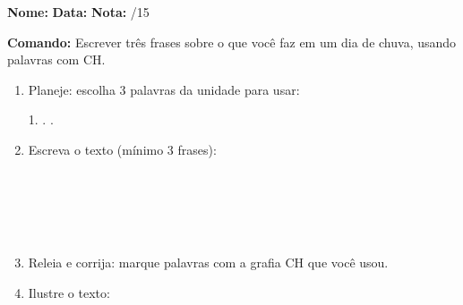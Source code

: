 \begin{exercicio}

\noindent\textbf{Nome:} \underline{\hspace{3.2cm}} \quad \textbf{Data:} \underline{\hspace{1.6cm}} \quad \textbf{Nota:} \underline{\hspace{0.9cm}}/15


\noindent\textbf{Comando:} Escrever três frases sobre o que você faz em um dia de chuva, usando palavras com CH.


\begin{enumerate}

  \item Planeje: escolha 3 palavras da unidade para usar:
  \begin{center}
  1. \underline{\hspace{3cm}} . \underline{\hspace{3cm}} . \underline{\hspace{3cm}}
  \end{center}

  \item Escreva o texto (mínimo 3 frases):
  \begin{center}
  \underline{\hspace{12cm}}\\\underline{\hspace{12cm}}\\\underline{\hspace{12cm}}\\\underline{\hspace{12cm}}\\\underline{\hspace{12cm}}
  \end{center}

  \item Releia e corrija: marque palavras com a grafia CH que você usou.

  \item Ilustre o texto:
  \begin{center}
  \end{center}

\end{enumerate}

\end{exercicio}

